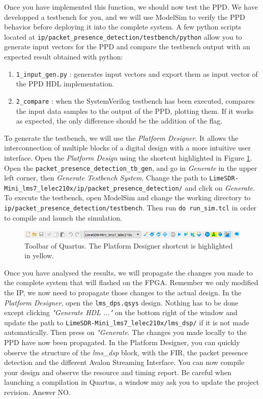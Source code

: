 Once you have implemented this function, we should now test the PPD. We have developped a testbench for you, and we will use ModelSim to verify the PPD behavior before deploying it into the complete system. A few python scripts located at \texttt{ip/packet\_presence\_detection/testbench/python} allow you to generate input vectors for the PPD and compare the testbench output with an expected result obtained with python:

\begin{enumerate}
    \item \texttt{1\_input\_gen.py} : generates input vectors and export them as input vector of the PPD HDL implementation.
    \item \texttt{2\_compare} : when the SystemVerilog testbench has been executed, compares the input data samples to the output of the PPD, plotting them. If it works as expected, the only difference should be the addition of the flag.
\end{enumerate}

To generate the testbench, we will use the \textit{Platform Designer}. It allows the interconnection of multiple blocks of a digital design with a more intuitive user interface. Open the \textit{Platform Design} using the shortcut highlighted in Figure \ref{fig:quartus_platform_designer}. Open the \texttt{packet\_presence\_detection\_tb\_gen}, and go in \textit{Generate} in the upper left corner, then \textit{Generate Testbench System}. Change the path to \texttt{LimeSDR-Mini\_lms7\_lelec210x/ip/packet\_presence\_detection/} and click on \textit{Generate}. To execute the testbench, open ModelSim and change the working directory to \texttt{ip/packet\_presence\_detection/testbench}. Then run \texttt{do run\_sim.tcl} in order to compile and launch the simulation.

\begin{figure}[H]
    \centering
    \includegraphics[scale=0.7]{figures/quartus_toolbar.PNG}
    \caption{Toolbar of Quartus. The Platform Designer shortcut is highlighted in yellow.}
    \label{fig:quartus_platform_designer}
\end{figure}

Once you have analysed the results, we will propagate the changes you made to the complete system that will flashed on the FPGA. Remember we only modified the IP, we now need to propagate those changes to the actual design. In the \textit{Platform Designer}, open the \texttt{lms\_dps.qsys} design. Nothing has to be done except clicking \textit{"Generate HDL ..."} on the bottom right of the window and update the path to
\texttt{LimeSDR-Mini\_lms7\_lelec210x/lms\_dsp/} if it is not made automatically. Then press on \textit{"Generate}. The changes you made locally to the PPD have now been propagated. In the Platform Designer, you can quickly observe the structure of the \textit{lms\_dsp} block, with the FIR, the packet presence detection and the different Avalon Streaming Interface. You can now compile your design and observe the resource and timing report. Be careful when launching a compilation in Quartus, a window may ask you to update the project revision. Answer NO.

